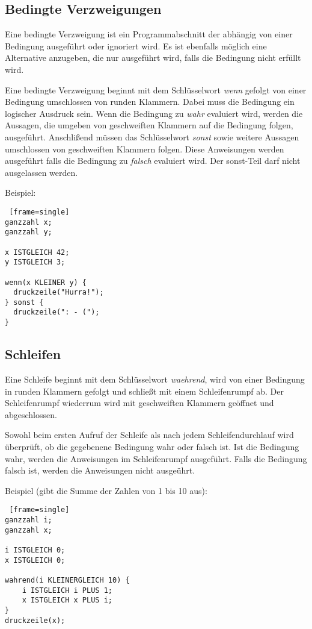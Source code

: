 \documentclass[12pt, a4paper, oneside, ngerman]{article}
\begin{document}
\subsection{Bedingte Verzweigungen}
Eine bedingte Verzweigung ist ein Programmabschnitt der abhängig von einer Bedingung ausgeführt oder ignoriert wird. 
Es ist ebenfalls möglich eine Alternative anzugeben, die nur ausgeführt wird, falls die Bedingung nicht erfüllt wird.

Eine bedingte Verzweigung beginnt mit dem Schlüsselwort \textit{wenn} gefolgt von einer Bedingung umschlossen von runden Klammern. Dabei muss die Bedingung ein logischer Ausdruck sein. Wenn die Bedingung zu \textit{wahr} evaluiert wird, werden die Aussagen, die umgeben von geschweiften Klammern auf die Bedingung folgen, ausgeführt. 
Anschlißend müssen das Schlüsselwort \textit{sonst} sowie weitere Aussagen umschlossen von geschweiften Klammern folgen. Diese Anweisungen werden ausgeführt falls die Bedingung zu \textit{falsch} evaluiert wird. Der sonst-Teil darf nicht ausgelassen werden.


\medskip
\noindent
Beispiel:
\begin{lstlisting} [frame=single] 
ganzzahl x;
ganzzahl y;

x ISTGLEICH 42;
y ISTGLEICH 3;

wenn(x KLEINER y) {
  druckzeile("Hurra!");
} sonst {
  druckzeile(": - (");
}

\end{lstlisting}

\subsection{Schleifen}
Eine Schleife beginnt mit dem Schlüsselwort \textit{waehrend}, wird von einer Bedingung in runden Klammern gefolgt und schließt mit einem Schleifenrumpf ab. Der Schleifenrumpf wiederrum wird mit geschweiften Klammern geöffnet und abgeschlossen.

Sowohl beim ersten Aufruf der Schleife als nach jedem Schleifendurchlauf wird überprüft, ob die gegebenene Bedingung wahr oder falsch ist. Ist die Bedingung wahr, werden die Anweisungen im Schleifenrumpf ausgeführt. Falls die Bedingung falsch ist, werden die Anweisungen nicht ausgeührt.

Beispiel (gibt die Summe der Zahlen von 1 bis 10 aus):
\begin{lstlisting} [frame=single] 
ganzzahl i;
ganzzahl x;

i ISTGLEICH 0;
x ISTGLEICH 0;

wahrend(i KLEINERGLEICH 10) {
	i ISTGLEICH i PLUS 1;
	x ISTGLEICH x PLUS i;
}
druckzeile(x);
\end{lstlisting}
	
\end{document}
